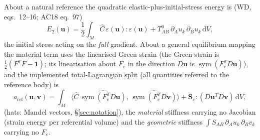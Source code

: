 \documentclass[11pt]{article}
\numberwithin{equation}{section}
\theoremstyle{remark}
\newcommand{\eps}{\varepsilon}
\newcommand{\dV}{\,\mathrm{d}V}
\newcommand{\sym}{\operatorname{sym}}
\newcommand{\vu}{\mathbf{u}}
\newcommand{\vv}{\mathbf{v}}
\newcommand{\Ch}{\hat{C}}
\newcommand{\Se}{\mathbf{S}_e}
\begin{document}
About a natural reference the quadratic elastic-plus-initial-stress energy
is (WD, eqs.~12--16; AC18 eq.~97)
\begin{equation}
  E_2(\vu) = \frac12\int_M \Ch\,\eps(\vu):\eps(\vu)
           + T^0_{AB}\,\partial_A u_k\,\partial_B u_k \dV ,
  \label{eq:E2}
\end{equation}
the initial stress acting on the \emph{full} gradient. About a general
equilibrium mapping the material term uses the linearised Green strain
(the Green strain is $\frac12(F^TF - \mathbf{1})$; its linearisation about
$F_e$ in the direction $D\vu$ is $\sym(F_e^TD\vu)$), and the implemented
total-Lagrangian split (all quantities referred to the reference body) is
\begin{equation}
  a_{\mathrm{ref}}(\vu,\vv) = \int_M
     \bigl\langle \Ch\,\widehat{\sym(F_e^TD\vu)},\,
                       \widehat{\sym(F_e^TD\vv)} \bigr\rangle
   + \Se : (D\vu^T D\vv) \dV ,
  \label{eq:matgeo}
\end{equation}
(hats: Mandel vectors, \S\ref{sec:notation}), the \emph{material} stiffness carrying no Jacobian
(strain energy per referential volume) and the \emph{geometric} stiffness
$\int S_{AB}\,\partial_A u_k\,\partial_B v_k$ carrying no $F_e$.
\end{document}
